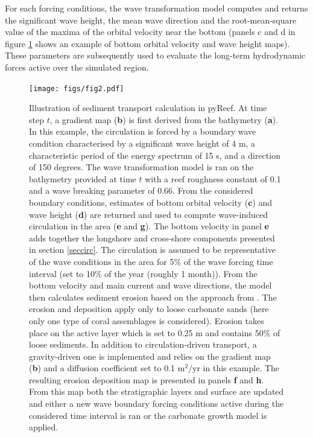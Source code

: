 \documentclass[default,jgrga]{agutex2015}
\begin{document}
\begin{article}
\noindent For each forcing conditions, the wave transformation model computes and returns the significant wave height, the mean wave direction and the root-mean-square value of the maxima of the orbital velocity near the bottom (panels c and d in figure \ref{circfig} shows an example of bottom orbital velocity and wave height maps). These parameters are subsequently used to evaluate the long-term hydrodynamic forces active over the simulated region.


\begin{figure}
\centering
\noindent\texttt{[image: figs/fig2.pdf]}
\caption{Illustration of sediment transport calculation in pyReef. At time step $t$, a gradient map (\textbf{b}) is first derived from the bathymetry (\textbf{a}). In this example, the circulation is forced by a boundary wave condition characterised by a significant wave height of 4 m, a characteristic period of the energy spectrum of 15 s, and a direction of 150 degrees. The wave transformation model is ran on the bathymetry provided at time $t$ with a reef roughness constant of 0.1 and a wave breaking parameter of 0.66. From the considered boundary conditions, estimates of bottom orbital velocity (\textbf{c}) and wave height (\textbf{d}) are returned and used to compute wave-induced circulation in the area (\textbf{e} and \textbf{g}). The bottom velocity in panel \textbf{e} adds together the longshore and cross-shore components presented in section \ref{seccirc}. The circulation is assumed to be representative of the wave conditions in the area for 5\% of the wave forcing time interval (set to 10\% of the year (roughly 1 month)). From the bottom velocity and main current and wave directions, the model then calculates sediment erosion based on the approach from \citet{Soulsby97}. The erosion and deposition apply only to loose carbonate sands (here only one type of coral assemblages is considered). Erosion takes place on the active layer which is set to 0.25 m and contains 50\% of loose sediments. In addition to circulation-driven transport, a gravity-driven one is implemented and relies on the gradient map (\textbf{b}) and a diffusion coefficient set to 0.1 $\textrm{m}^2\textrm{/yr}$ in this example. The resulting erosion deposition map is presented in panels \textbf{f} and \textbf{h}. From this map both the stratigraphic layers and surface are updated and either a new wave boundary forcing conditions active during the considered time interval is ran or the carbonate growth model is applied.}
\label{circfig}
\end{figure}


\end{article}
\end{document}
